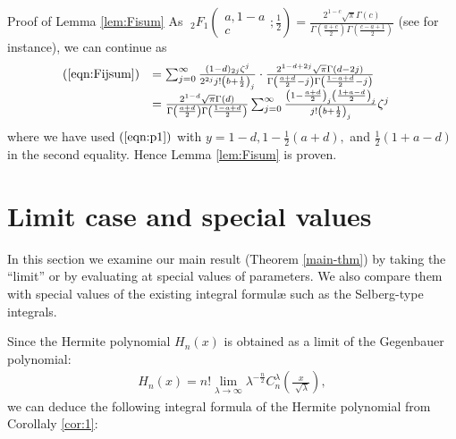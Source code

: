 \documentclass{article}
\numberwithin{equation}{section}
\newenvironment{proof*}[1]{\noindent\textbf{#1\ }}{\hspace*{\fill}$\Box$\medskip}
\begin{document}
\begin{proof*}{Proof of Lemma \ref{lem:Fisum}}
  As $\;_2 F_1 \left( \begin{array}{c}
    a, 1 - a\\
    c
  \end{array} ; \frac{1}{2} \right) = \frac{2^{1 - c} \sqrt{\pi} \Gamma
  (c)}{\Gamma \left( \frac{a + c}{2} \right) \Gamma \left( \frac{c - a + 1}{2}
  \right)}$ (see {\cite[Thm. 5.4]{andrews2000special}} for instance), we can
  continue as
  \begin{eqnarray}
    & \begin{array}{ll}
      (\ref{eqn:Fijsum}) & = \sum_{j = 0}^{\infty} \frac{(1 - d)_{2 j}
      \zeta^j}{2^{2 j} j! \left( b + \frac{1}{2} \right)_j} \cdot \frac{2^{1 -
      d + 2 j} \sqrt{\pi} \Gamma (d - 2 j)}{\Gamma \left( \frac{a + d}{2} - j
      \right) \Gamma \left( \frac{1 - a + d}{2} - j \right)}\\
      & = \frac{2^{1 - d} \sqrt{\pi} \Gamma (d)}{\Gamma \left( \frac{a +
      d}{2} \right) \Gamma \left( \frac{1 - a + d}{2} \right)} \sum_{j =
      0}^{\infty} \frac{\left( 1 - \frac{a + d}{2} \right)_j \left( \frac{1 +
      a - d}{2} \right)_j}{j! \left( b + \frac{1}{2} \right)_j} \zeta^j
    \end{array} &  \nonumber
  \end{eqnarray}
  where we have used $(\ref{eqn:p1})$ with $y = 1 - d, 1 - \frac{1}{2} (a +
  d),$ and $\frac{1}{2} (1 + a - d)$ in the second equality. Hence Lemma
  \ref{lem:Fisum} is proven.
\end{proof*}

\section{Limit case and special values}\label{sec:4}

In this section we examine our main result (Theorem \ref{main-thm}) by taking
the ``limit'' or by evaluating at special values of parameters. We also
compare them with special values of the existing integral formul{\ae} such as
the Selberg-type integrals.

Since the Hermite polynomial $H_n (x)$ is obtained as a limit of the
Gegenbauer polynomial:
\begin{eqnarray}
  & H_n (x) = n! \lim_{\lambda \rightarrow \infty} \lambda^{- \frac{n}{2}}
  C_n^{\lambda} \left( \frac{x}{\sqrt[]{\lambda}} \right), &  \nonumber
\end{eqnarray}
we can deduce the following integral formula of the Hermite polynomial from
Corollaly \ref{cor:1}:
\end{document}
